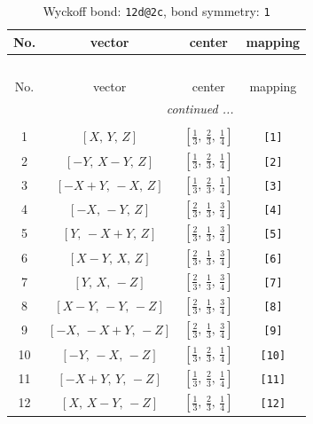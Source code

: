 \documentclass[fleqn,8pt]{jsarticle}
\begin{document}
\begin{longtable}{cccc}
\caption{Wyckoff bond: {\tt 12d@2c}, bond symmetry: {\tt 1}}
 \\
 \hline \hline
No. & vector & center & mapping \\ \hline \endfirsthead

\multicolumn{3}{l}{\tablename\ \thetable{}} \\
 \hline \hline
No. & vector & center & mapping \\ \hline \endhead

 \hline \hline
\multicolumn{3}{r}{\footnotesize\it continued ...} \\ \endfoot

 \hline \hline
\multicolumn{3}{r}{} \\ \endlastfoot

1 & $\left[ X,\, Y,\, Z \right]$ & $\left[ \frac{1}{3},\, \frac{2}{3},\, \frac{1}{4} \right]$ & {\tt [1]} \\ \hline
2 & $\left[ - Y,\, X - Y,\, Z \right]$ & $\left[ \frac{1}{3},\, \frac{2}{3},\, \frac{1}{4} \right]$ & {\tt [2]} \\ \hline
3 & $\left[ - X + Y,\, - X,\, Z \right]$ & $\left[ \frac{1}{3},\, \frac{2}{3},\, \frac{1}{4} \right]$ & {\tt [3]} \\ \hline
4 & $\left[ - X,\, - Y,\, Z \right]$ & $\left[ \frac{2}{3},\, \frac{1}{3},\, \frac{3}{4} \right]$ & {\tt [4]} \\ \hline
5 & $\left[ Y,\, - X + Y,\, Z \right]$ & $\left[ \frac{2}{3},\, \frac{1}{3},\, \frac{3}{4} \right]$ & {\tt [5]} \\ \hline
6 & $\left[ X - Y,\, X,\, Z \right]$ & $\left[ \frac{2}{3},\, \frac{1}{3},\, \frac{3}{4} \right]$ & {\tt [6]} \\ \hline
7 & $\left[ Y,\, X,\, - Z \right]$ & $\left[ \frac{2}{3},\, \frac{1}{3},\, \frac{3}{4} \right]$ & {\tt [7]} \\ \hline
8 & $\left[ X - Y,\, - Y,\, - Z \right]$ & $\left[ \frac{2}{3},\, \frac{1}{3},\, \frac{3}{4} \right]$ & {\tt [8]} \\ \hline
9 & $\left[ - X,\, - X + Y,\, - Z \right]$ & $\left[ \frac{2}{3},\, \frac{1}{3},\, \frac{3}{4} \right]$ & {\tt [9]} \\ \hline
10 & $\left[ - Y,\, - X,\, - Z \right]$ & $\left[ \frac{1}{3},\, \frac{2}{3},\, \frac{1}{4} \right]$ & {\tt [10]} \\ \hline
11 & $\left[ - X + Y,\, Y,\, - Z \right]$ & $\left[ \frac{1}{3},\, \frac{2}{3},\, \frac{1}{4} \right]$ & {\tt [11]} \\ \hline
12 & $\left[ X,\, X - Y,\, - Z \right]$ & $\left[ \frac{1}{3},\, \frac{2}{3},\, \frac{1}{4} \right]$ & {\tt [12]} \\
\end{longtable}
\end{document}

